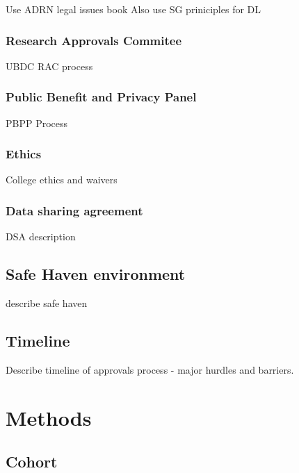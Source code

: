 \documentclass[12pt,]{report}
\begin{document}
Use ADRN legal issues book Also use SG priniciples for DL

\subsection{Research Approvals Commitee}\label{subsec:rac}

UBDC RAC process

\subsection{Public Benefit and Privacy Panel}\label{subsec:pbpp}

PBPP Process

\subsection{Ethics}\label{subsec:ethics}

College ethics and waivers

\subsection{Data sharing agreement}\label{subsec:dsa}

DSA description

\section{Safe Haven environment}\label{sec:safe-haven}

describe safe haven

\section{Timeline}\label{sec:timeline}

Describe timeline of approvals process - major hurdles and barriers.

\FloatBarrier
\newpage
{}

\chapter{Methods}\label{ch:methods}

\section{Cohort}\label{sec:cohort}
\end{document}
